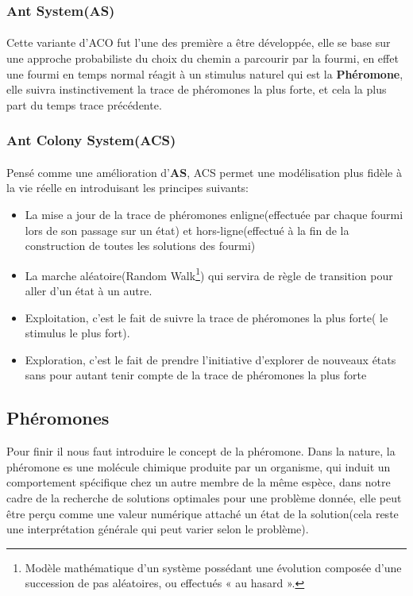 \subsubsection{Ant System(AS)}
\paragraph{}\label{AS}
Cette variante d'ACO fut l'une des première a être développée, elle se base sur une approche probabiliste du choix du chemin a parcourir par la fourmi, en effet une fourmi en temps normal réagit à un stimulus naturel qui est la \textbf{Phéromone}, elle suivra instinctivement la trace de phéromones la plus forte, et cela la plus part du temps trace précédente.

\subsubsection{Ant Colony System(ACS)}
\paragraph{}\label{ACS}
Pensé comme une amélioration d'\textbf{AS}, ACS permet une modélisation plus fidèle à la vie réelle en introduisant les principes suivants: 
\begin{itemize}
	\item La mise a jour de la trace de phéromones enligne(effectuée par chaque fourmi lors de son passage sur un état) et hors-ligne(effectué à la fin de la construction de toutes les solutions des fourmi)
	\item La marche aléatoire(Random Walk\footnote{Modèle mathématique  d'un système possédant une évolution composée d'une succession de pas aléatoires, ou effectués « au hasard ».}) qui servira de règle de transition pour aller d'un état à un autre.
	\item Exploitation, c'est le fait de suivre la trace de phéromones la plus forte( le stimulus le plus fort).
	\item Exploration, c'est le fait de prendre l'initiative d'explorer de nouveaux états sans pour autant tenir compte de la trace de phéromones la plus forte
\end{itemize}


\subsection{Phéromones}
Pour finir il nous faut introduire le concept de la phéromone. Dans la nature, la phéromone es une molécule chimique produite par un organisme, qui induit un comportement spécifique chez un autre membre de la même espèce, dans notre cadre de la recherche de solutions optimales pour une problème donnée, elle peut être perçu comme une valeur numérique attaché un état de la solution(cela reste une interprétation générale qui peut varier selon le problème).
